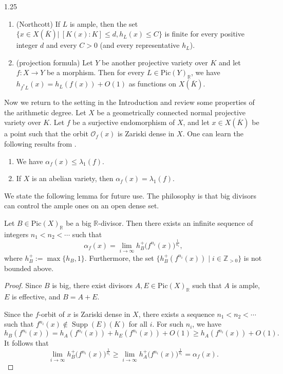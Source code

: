 \documentclass[12pt]{amsart}
\begin{document}
\begin{spacing}{1.25}
\begin{proposition}
\begin{enumerate}
\item (Northcott)
If $L$ is ample, then the set $\{x\in X(\overline{K})|\ [K(x):K]\leq d,h_L(x)\leq C\}$ is finite for every positive integer $d$ and every $C>0$ (and every representative $h_L$). 

\item (projection formula)
Let $Y$ be another projective variety over $K$ and let $f:X\rightarrow Y$ be a morphism. Then for every $L\in\mathrm{Pic}(Y)_{\mathbb{R}}$, we have $h_{f^*L}(x)=h_L(f(x))+O(1)$ as functions on $X(\overline{K})$.
\end{enumerate}
\end{proposition}

Now we return to the setting in the Introduction and review some properties of the arithmetic degree. Let $X$ be a geometrically connected normal projective variety over $K$. Let $f$ be a surjective endomorphism of $X$, and let $x\in X(\overline{K})$ be a point such that the orbit $\mathcal{O}_f(x)$ is Zariski dense in $X$. One can learn the following results from \cite{KS16,Sil17,Oh22}.

\begin{proposition}\label{Prop_arithdeg}
\begin{enumerate}
\item
We have $\alpha_f(x)\leq\lambda_1(f)$.
\item
If $X$ is an abelian variety, then $\alpha_f(x)=\lambda_1(f)$.
\end{enumerate}
\end{proposition}

We state the following lemma for future use. The philosophy is that big divisors can control the ample ones on an open dense set.

\begin{lemma}\label{Lem_bight}
Let $B \in\mathrm{Pic}(X)_{\mathbb{R}}$ be a big $\mathbb{R}$-divisor. Then there exists an infinite sequence of integers $n_1 < n_2 < \cdots$ such that
\[
\alpha_f(x) = \lim_{i \to \infty} h_B^+\big(f^{n_i}(x)\big)^{\frac{1}{n_i}},
\]
where $h_B^+ := \max\{h_B, 1\}$. Furthermore, the set $\{h_B^+(f^{n_i}(x)) \mid i \in \mathbb{Z}_{>0} \}$ is not bounded above.
\end{lemma}

\begin{proof}
Since $B$ is big, there exist divisors $A, E \in \mathrm{Pic}(X)_{\mathbb{R}}$ such that $A$ is ample, $E$ is effective, and $B = A + E$.

Since the $f$-orbit of $x$ is Zariski dense in $X$, there exists a sequence $n_1 < n_2 < \cdots$ such that $f^{n_i}(x) \notin \operatorname{Supp}(E)(K)$ for all $i$. For such $n_i$, we have
\[
h_B(f^{n_i}(x)) = h_A(f^{n_i}(x)) + h_E(f^{n_i}(x)) + O(1) \geq h_A(f^{n_i}(x)) + O(1).
\]
It follows that
\[
\lim_{i \to \infty} h_B^+\big(f^{n_i}(x)\big)^{\frac{1}{n_i}} \geq \lim_{i \to \infty} h_A^+\big(f^{n_i}(x)\big)^{\frac{1}{n_i}} = \alpha_f(x).
\]


\end{proof}
\end{spacing}
\end{document}
